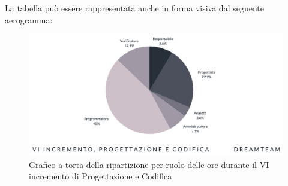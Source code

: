 La tabella può essere rappresentata anche in forma visiva dal seguente aerogramma:
\begin{figure}[H]
\centering
\includegraphics[scale=0.55]{Sezioni/SezioniPreventivo/grafici/Preventivo_torta_progettazione_VI.png}
\caption{Grafico a torta della ripartizione per ruolo delle ore durante il VI incremento di Progettazione e Codifica}
\end{figure}

\pagebreak


